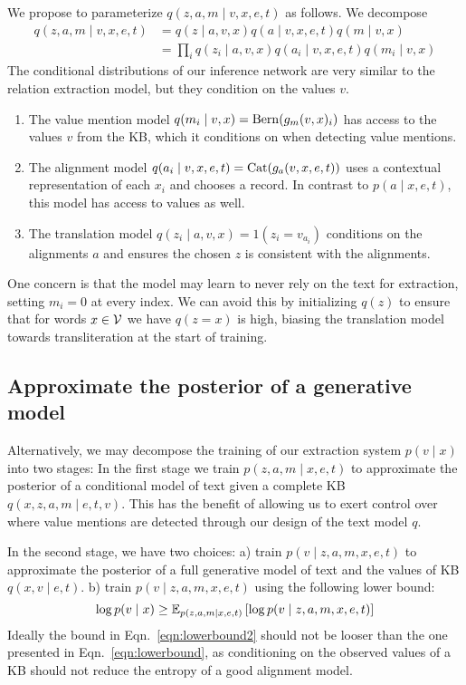 \documentclass[12pt]{article}
\begin{document}
We propose to parameterize $q(z,a,m\mid v,x,e,t)$ as follows.
We decompose 
\begin{equation}
\begin{aligned}
q(z,a,m\mid v,x,e,t) &= q(z \mid a,v,x)q(a\mid v,x,e,t)q(m \mid v,x)\\
&= \prod_i q(z_i \mid a,v,x)q(a_i \mid v,x,e,t)q(m_i \mid v,x)
\end{aligned}
\end{equation}
The conditional distributions of our inference network
are very similar to the relation extraction model,
but they condition on the values $v$.
\begin{enumerate}
\item The value mention model $q(m_i \mid v,x) = \mathrm{Bern}(g_{m}(v,x)_i)$ 
    has access to the values $v$ from the KB, which it conditions on
    when detecting value mentions. 
\item The alignment model $q(a_i \mid v,x,e,t) = \mathrm{Cat}(g_{a}(v,x,e,t))$
    uses a contextual representation of each $x_i$ and chooses a record.
    In contrast to $p(a\mid x,e,t)$, this model has access to values as well.
\item The translation model $q(z_i \mid a,v,x) = 1(z_i = v_{a_i})$
    conditions on the alignments $a$ and ensures the chosen $z$ is consistent
    with the alignments. 
\end{enumerate}

One concern is that the model may learn to never rely on the text for extraction,
setting $m_i = 0$ at every index.
We can avoid this by initializing $q(z)$ to ensure that for words $x \in \mathcal{V}$ 
we have $q(z = x)$ is high, biasing the translation model towards transliteration
at the start of training.

\subsection{Approximate the posterior of a generative model}
Alternatively, we may decompose the training of our extraction system $p(v\mid x)$ into two stages:
In the first stage we train $p(z,a,m\mid x,e,t)$ to approximate the posterior
of a conditional model of text given a complete KB $q(x,z,a,m \mid e,t,v)$.
This has the benefit of allowing us to exert control over where value mentions are detected
through our design of the text model $q$.

In the second stage, we have two choices:
a) train $p(v \mid z,a,m,x,e,t)$ to approximate the posterior of a full generative model of text and
the values of KB $q(x,v\mid e,t)$.
b) train $p(v \mid z,a,m,x,e,t)$ using the following lower bound:
\begin{equation}
\label{eqn:lowerbound2}
\log p(v\mid x) \geq
\mathbb{E}_{p(z,a,m\mid x,e,t)}\left[\log p(v\mid z,a,m, x,e,t)\right]
\end{equation}
Ideally the bound in Eqn.~\ref{eqn:lowerbound2}
should not be looser than the one presented in Eqn.~\ref{eqn:lowerbound},
as conditioning on the observed values of a KB should not reduce the entropy of
a good alignment model.
\end{document}

